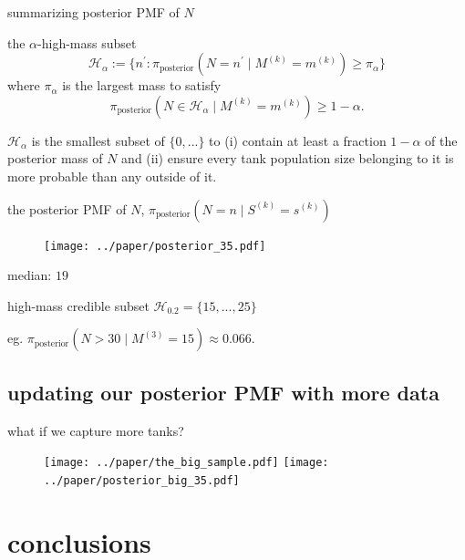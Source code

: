 \documentclass[10pt]{beamer}
\begin{document}
\begin{frame}[t]{summarizing posterior PMF of $N$}

\begin{alertblock}{the $\alpha$-high-mass subset }
\begin{equation}
	\mathcal{H}_\alpha := \{n^\prime : \pi_{\text{posterior}}(N=n^\prime \mid M^{(k)}=m^{(k)}) \geq \pi_\alpha\}
\end{equation} where $\pi_\alpha$ is the largest mass to satisfy 
\begin{equation}
	\pi_{\text{posterior}}(N \in \mathcal{H}_\alpha \mid M^{(k)}=m^{(k)}) \geq 1 - \alpha.
\end{equation}

\end{alertblock}
$\mathcal{H}_\alpha$ is the smallest subset of $\{0,...\}$ to (i) contain at least a fraction $1-\alpha$ of the posterior mass of $N$ and (ii) ensure every tank population size belonging to it is more probable than any outside of it.
\end{frame}


\begin{frame}[t]{the posterior PMF of $N$, $\pi_{\text{posterior}}(N=n \mid S^{(k)}=s^{(k)})$}
\begin{figure}[h!]
	\centering
	\texttt{[image: ../paper/posterior\_35.pdf]}
\end{figure}

median: $19$

high-mass credible subset $\mathcal{H}_{0.2}=\{15, ..., 25\}$

eg. $\pi_{\text{posterior}}(N>30 \mid M^{(3)}=15)\approx 0.066$.
\end{frame}

\subsection{updating our posterior PMF with more data}

\begin{frame}[t]{what if we capture more tanks?}
  \begin{figure}[h!]
        	\centering
        	\texttt{[image: ../paper/the\_big\_sample.pdf]}
	 \texttt{[image: ../paper/posterior\_big\_35.pdf]}
\end{figure}
\end{frame}

\section{conclusions}
\end{document}

